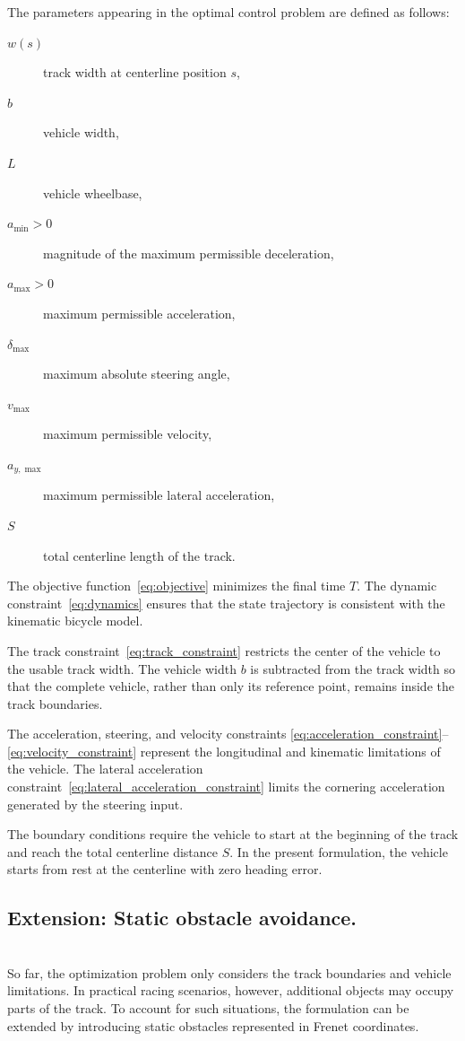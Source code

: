 The parameters appearing in the optimal control problem are defined as follows:
\begin{description}
    \item[\(w(s)\)] track width at centerline position \(s\),
    \item[\(b\)] vehicle width,
    \item[\(L\)] vehicle wheelbase,
    \item[\(a_{\min}>0\)] magnitude of the maximum permissible deceleration,
    \item[\(a_{\max}>0\)] maximum permissible acceleration,
    \item[\(\delta_{\max}\)] maximum absolute steering angle,
    \item[\(v_{\max}\)] maximum permissible velocity,
    \item[\(a_{y,\max}\)] maximum permissible lateral acceleration,
    \item[\(S\)] total centerline length of the track.
\end{description}

The objective function~\eqref{eq:objective} minimizes the final time $T$.
The dynamic constraint~\eqref{eq:dynamics} ensures that the state trajectory
is consistent with the kinematic bicycle model.

The track constraint~\eqref{eq:track_constraint} restricts the center of the
vehicle to the usable track width. The vehicle width $b$ is subtracted from
the track width so that the complete vehicle, rather than only its reference
point, remains inside the track boundaries.

The acceleration, steering, and velocity constraints
\eqref{eq:acceleration_constraint}--\eqref{eq:velocity_constraint} represent
the longitudinal and kinematic limitations of the vehicle. The lateral
acceleration constraint~\eqref{eq:lateral_acceleration_constraint} limits the
cornering acceleration generated by the steering input.

The boundary conditions require the vehicle to start at the beginning of the
track and reach the total centerline distance $S$. In the present formulation,
the vehicle starts from rest at the centerline with zero heading error.


\subsection{Extension: Static obstacle avoidance.}\;\\
So far, the optimization problem only considers the track boundaries and vehicle limitations. In practical racing scenarios, however, additional objects may occupy parts of the track. To account for such situations, the formulation can be extended by introducing static obstacles represented in Frenet coordinates.

